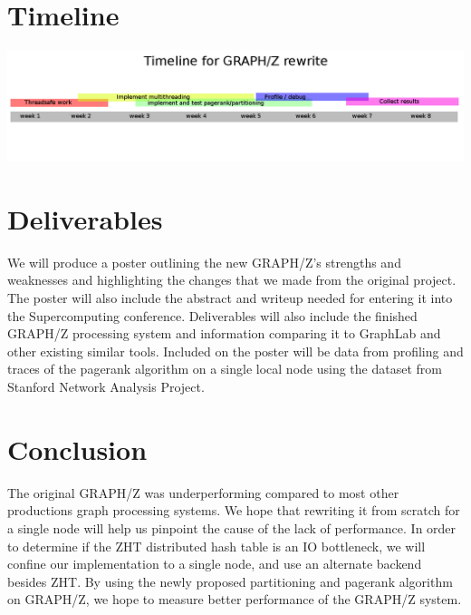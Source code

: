\documentclass[10pt]{article}
\begin{document}
  \section{Timeline}
  \includegraphics[width=\textwidth]{timeline.png}
\begin{multicols}{2}
  \section{Deliverables}
  We will produce a poster outlining the new GRAPH/Z's strengths and weaknesses and highlighting the changes that we made from the original project. The poster will also include the abstract and writeup needed for entering it into the Supercomputing conference.  Deliverables will also include the finished GRAPH/Z processing system and information comparing it to GraphLab and other existing similar tools. Included on the poster will be data from profiling and traces of the pagerank algorithm on a single local node  using the dataset from Stanford Network Analysis Project.
  
   \section{Conclusion}
   The original GRAPH/Z was underperforming compared to most other productions graph processing systems. We hope that rewriting it from scratch for a single node will help us pinpoint the cause of the lack of performance. In order to determine if the ZHT distributed hash table is an IO bottleneck, we will confine our implementation to a single node, and use an alternate backend besides ZHT. By using the newly proposed partitioning and pagerank algorithm on GRAPH/Z, we hope to measure better performance of the GRAPH/Z system.
   
   
\end{multicols}
\end{document}
